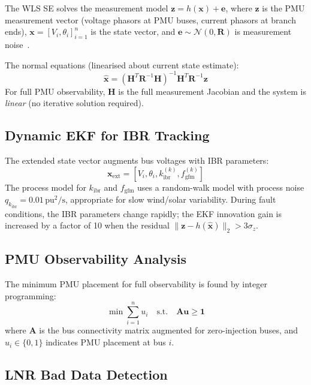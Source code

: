 \documentclass[11pt, a4paper]{article}
\newcommand{\pu}{\,\text{pu}}
\newcommand{\kibr}{k_{\mathrm{ibr}}}
\newcommand{\fgfm}{f_{\mathrm{gfm}}}
\begin{document}
The WLS SE solves the measurement model $\mathbf{z} = h(\mathbf{x}) + \mathbf{e}$,
where $\mathbf{z}$ is the PMU measurement vector (voltage phasors at PMU buses,
current phasors at branch ends), $\mathbf{x} = [V_i, \theta_i]_{i=1}^n$
is the state vector, and $\mathbf{e} \sim \mathcal{N}(0, \mathbf{R})$
is measurement noise~\cite{Monticelli1999}.

The normal equations (linearised about current state estimate):
\begin{equation}
  \hat{\mathbf{x}} = (\mathbf{H}^T \mathbf{R}^{-1} \mathbf{H})^{-1}
    \mathbf{H}^T \mathbf{R}^{-1} \mathbf{z}
  \label{eq:wls}
\end{equation}
For full PMU observability, $\mathbf{H}$ is the full measurement Jacobian
and the system is \emph{linear} (no iterative solution required).

\subsection{Dynamic EKF for IBR Tracking}

The extended state vector augments bus voltages with IBR parameters:
\begin{equation}
  \mathbf{x}_{\mathrm{ext}} = [V_i, \theta_i, \kibr^{(k)}, \fgfm^{(k)}]
  \label{eq:ext_state}
\end{equation}
The process model for $\kibr$ and $\fgfm$ uses a random-walk model
with process noise $q_{\kibr} = 0.01\pu^2/\text{s}$,
appropriate for slow wind/solar variability.
During fault conditions, the IBR parameters change rapidly;
the EKF innovation gain is increased by a factor of 10 when the
residual $\|\mathbf{z} - h(\hat{\mathbf{x}})\|_2 > 3\sigma_z$.

\subsection{PMU Observability Analysis}

The minimum PMU placement for full observability is found by integer
programming:
\begin{equation}
  \min \sum_{i=1}^n u_i \quad \text{s.t.} \quad \mathbf{A}\mathbf{u} \geq \mathbf{1}
  \label{eq:pmu_placement}
\end{equation}
where $\mathbf{A}$ is the bus connectivity matrix augmented for zero-injection
buses, and $u_i \in \{0,1\}$ indicates PMU placement at bus $i$.

\subsection{LNR Bad Data Detection}
\end{document}

